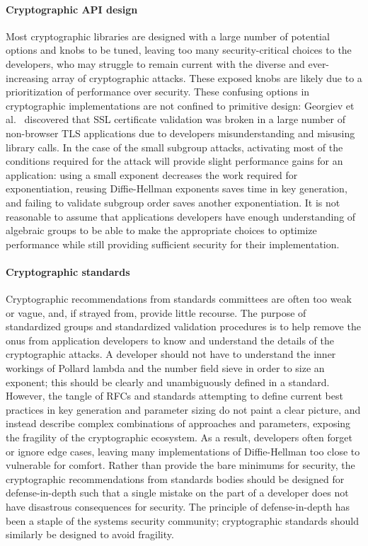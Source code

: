 \paragraph{Cryptographic API design}
Most cryptographic libraries are designed with a large number of potential
options and knobs to be tuned, leaving too many security-critical choices to
the developers, who may struggle to remain current with the diverse and
ever-increasing array of cryptographic attacks. These exposed knobs are likely
due to a prioritization of performance over security. These confusing options in
cryptographic implementations are not confined to primitive design: Georgiev et al.~\cite{Georgiev:2012:MDC:2382196.2382204} discovered that SSL certificate validation was broken in a large number of non-browser TLS applications due to developers misunderstanding and misusing library calls.  In the case of the small
subgroup attacks, activating most of the conditions required for the attack
will provide slight performance gains for an application: using a small
exponent decreases the work required for exponentiation, reusing Diffie-Hellman
exponents saves time in key generation, and failing to validate subgroup order
saves another exponentiation. It is not reasonable to assume that applications
developers have enough understanding of algebraic groups to be able to make the
appropriate choices to optimize performance while still providing sufficient
security for their implementation.

\paragraph{Cryptographic standards}
Cryptographic recommendations from standards committees are often too weak or
vague, and, if strayed from, provide little recourse. The purpose of
standardized groups and standardized validation procedures is to help remove
the onus from application developers to know and understand the details of the
cryptographic attacks. A developer should not have to understand the inner
workings of Pollard lambda and the number field sieve in order to size an
exponent; this should be clearly and unambiguously defined in a standard.
However, the tangle of RFCs and standards attempting to define current best practices
in key generation and parameter sizing do not paint a clear picture, and instead 
describe complex combinations of approaches and
parameters, exposing the fragility of the cryptographic ecosystem. As a result,
developers often forget or ignore edge cases, leaving many implementations of
Diffie-Hellman too close to vulnerable for comfort. Rather than provide the
bare minimums for security, the cryptographic recommendations from standards
bodies should be designed for defense-in-depth such that a single mistake on the
part of a developer does not have disastrous consequences for security.  The
principle of defense-in-depth has been a staple of the systems security
community; cryptographic standards should similarly be designed to avoid
fragility.

